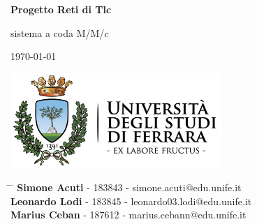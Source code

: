 \documentclass[12pt,a4paper]{article}
\begin{document}
	
	\newcommand{\subf}[2]{%
		{\small\begin{tabular}[t]{@{}c@{}}
				#1\\#2
		\end{tabular}}%
	}
	
	\begin{titlepage}
		\begin{center}
			\vspace*{3cm}
			
			\Huge
			\textbf{Progetto Reti di Tlc}
			
			\vspace{0.3cm}
			\Huge
			 sistema a coda M/M/$c$
			
			\vspace{0.8cm}
			\large
			\today
			
			
			\vspace{0.5cm}
			\LARGE
			
			
			\vspace{3cm}
			
			\textbf{}
            \includegraphics[width=0.6\textwidth]{logo-unife.png}
			
			\vfill
			
			
			
			\vspace{2.8cm}
			
			
			
			\Large
			
			
			
			
		\end{center}
		\Large
		\begin{tabbing}
			\hspace*{0em}\= \hspace*{0em} \= \kill %
			\>\> \textbf{Simone Acuti} - 183843 - simone.acuti@edu.unife.it\\
			\>\> \textbf{Leonardo Lodi} - 183845 - leonardo03.lodi@edu.unife.it\\
			\>\> \textbf{Marius Ceban} - 187612 - marius.cebann@edu.unife.it\\
		\end{tabbing}
		
\end{titlepage}
\end{document}
